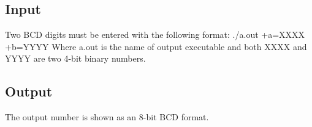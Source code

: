 \subsection{Input}
Two BCD digits must be entered with the following format:
./a.out +a=XXXX +b=YYYY
Where a.out is the name of output executable and both XXXX and YYYY are two 4-bit binary numbers.
\subsection{Output}
The output number is shown as an 8-bit BCD format.

